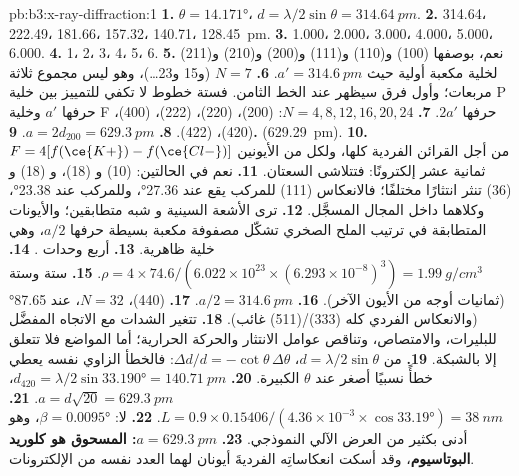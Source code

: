 \begin{solution}{pb:b3:x-ray-diffraction:1}
\textbf{1.} $\theta = \ang{14.171}$، $d = \lambda/2\sin\theta = \qty{314.64}{pm}$.
\textbf{2.} 314.64، 222.49، 181.66، 157.32، 140.71، \qty{128.45}{pm}.
\textbf{3.} 1.000، 2.000، 3.000، 4.000، 5.000، 6.000.
\textbf{4.} 1، 2، 3، 4، 5، 6.
\textbf{5.} نعم، بوصفها (100) و(110) و(111) و(200) و(210) و(211) لخلية مكعبة أولية
حيث $a' = \qty{314.6}{pm}$.
\textbf{6.} $N = 7$ (و15 و23\dots)، وهو ليس مجموع ثلاثة مربعات؛ 
وأول فرق سيظهر عند الخط الثامن. فستة خطوط لا تكفي للتمييز بين خلية P
حرفها $a'$ وخلية F حرفها $2a'$.
\textbf{7.} $N = 4, 8, 12, 16, 20, 24$: (200)، (220)، (222)، (400)، (420)، (422).
\textbf{8.} $a = 2d_{200} = \qty{629.3}{pm}$.
\textbf{9.}  (\qty{629.29}{pm}).
\textbf{10.} $F = 4[f(\ce{K+}) - f(\ce{Cl-})]$ من أجل القرائن الفردية كلها، ولكل من الأيونين ثمانية عشر
إلكترونًا: فتتلاشى السعتان.
\textbf{11.} نعم في الحالتين:  (10) و (18)، و (18) و (36)
تنثر انتثارًا مختلفًا؛ فالانعكاس (111) للمركب  يقع عند \ang{27.36}، وللمركب  عند \ang{23.38}،
وكلاهما داخل المجال المسجَّل.
\textbf{12.} ترى الأشعة السينية  و شبه متطابقين؛ والأيونات المتطابقة في
ترتيب الملح الصخري تشكّل مصفوفة مكعبة بسيطة حرفها $a/2$، وهي خلية ظاهرية.
\textbf{13.} أربع وحدات .
\textbf{14.} $\rho = 4 \times 74.6/(6.022\times10^{23} \times (6.293\times10^{-8})^3) =
\qty{1.99}{g/cm^3}$.
\textbf{15.} ستة وستة (ثمانيات أوجه من الأيون الآخر).
\textbf{16.} $a/2 = \qty{314.6}{pm}$.
\textbf{17.} (440)، $N = 32$، عند \ang{87.65} (والانعكاس الفردي كله (333)/(511) غائب).
\textbf{18.} تتغير الشدات مع الاتجاه المفضَّل للبليرات، 
والامتصاص، وتناقص عوامل الانتثار والحركة الحرارية؛ أما المواضع
فلا تتعلق إلا بالشبكة.
\textbf{19.} من $d = \lambda/2\sin\theta$، $\Delta d/d = -\cot\theta\,\Delta\theta$: فالخطأ الزاوي نفسه
يعطي خطأً نسبيًا أصغر عند $\theta$ الكبيرة.
\textbf{20.} $d_{420} = \lambda/2\sin\ang{33.190} = \qty{140.71}{pm}$، $a = d\sqrt{20} =
\qty{629.3}{pm}$.
\textbf{21.} $L = 0.9 \times 0.15406/(4.36\times10^{-3} \times \cos\ang{33.19}) = \qty{38}{nm}$.
\textbf{22.} لا: $\beta = \ang{0.0095}$، وهو أدنى بكثير من العرض الآلي النموذجي.
\textbf{23.} \textbf{$a = \qty{629.3}{pm}$: المسحوق هو كلوريد البوتاسيوم}، وقد أسكت انعكاساتِه
الفرديةَ أيونان لهما العدد نفسه من الإلكترونات.
\end{solution}
